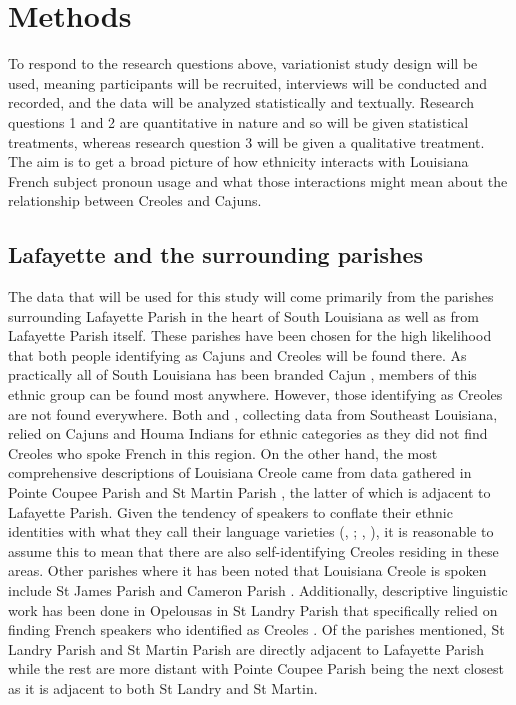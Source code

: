 \chapter{Methods}
  To respond to the research questions above, variationist study design will be used, meaning participants will be recruited, interviews will be conducted and recorded, and the data will be analyzed statistically and textually.
  Research questions 1 and 2 are quantitative in nature and so will be given statistical treatments, whereas research question 3 will be given a qualitative treatment.
  The aim is to get a broad picture of how ethnicity interacts with Louisiana French subject pronoun usage and what those interactions might mean about the relationship between Creoles and Cajuns.

  \section{Lafayette and the surrounding parishes}
    The data that will be used for this study will come primarily from the parishes surrounding Lafayette Parish in the heart of South Louisiana as well as from Lafayette Parish itself.
    These parishes have been chosen for the high likelihood that both people identifying as Cajuns and Creoles will be found there.
    As practically all of South Louisiana has been branded Cajun \parencite{giancarlo_dont_2019}, members of this ethnic group can be found most anywhere.
    However, those identifying as Creoles are not found everywhere.
    Both \textcite{rottet_language_1995} and \textcite{dajko_ethnic_2009}, collecting data from Southeast Louisiana, relied on Cajuns and Houma Indians for ethnic categories as they did not find Creoles who spoke French in this region.
    On the other hand, the most comprehensive descriptions of Louisiana Creole came from data gathered in Pointe Coupee Parish \parencite{klingler_if_2003} and St Martin Parish \parencite{neumann_creole_1985}, the latter of which is adjacent to Lafayette Parish.
    Given the tendency of speakers to conflate their ethnic identities with what they call their language varieties (\citeauthor{brown_pronominal_1988}, \citeyear[p.~5]{brown_pronominal_1988}; \citeauthor{klingler_language_2003}, \citeyear{klingler_language_2003}), it is reasonable to assume this to mean that there are also self-identifying Creoles residing in these areas.
    Other parishes where it has been noted that Louisiana Creole is spoken include St James Parish and Cameron Parish \parencite[p.~7]{rottet_language_1995}.
    Additionally, descriptive linguistic work has been done in Opelousas in St Landry Parish that specifically relied on finding French speakers who identified as Creoles \parencite{klingler_language_2003}.
    Of the parishes mentioned, St Landry Parish and St Martin Parish are directly adjacent to Lafayette Parish while the rest are more distant with Pointe Coupee Parish being the next closest as it is adjacent to both St Landry and St Martin.

